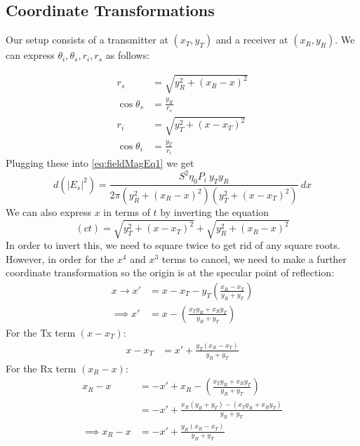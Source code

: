 \documentclass{article}
\begin{document}
\subsection*{Coordinate Transformations}
Our setup consists of a transmitter at $(x_T, y_T)$ and a receiver at 
$(x_R, y_R)$. We can express $\theta_i, \theta_s, r_i, r_s$ as follows:

\begin{align*}
   r_s &= \sqrt{y_R^2 + (x_R - x)^2} \\
   \cos \theta_s &= \frac{y_R}{r_s} \\
   r_i &= \sqrt{y_T^2 + (x - x_T)^2} \\
   \cos \theta_i &= \frac{y_T}{r_i}
\end{align*}
Plugging these into \eqref{eq:fieldMagEq1} we get
\begin{equation}
   d(|E_s|^2) = \frac{S^2 \eta_0 P_i \ y_T y_R }{2 \pi (y_R^2 + (x_R - x)^2) ( y_T^2
      + (x - x_T)^2)} \ dx
   \label{eq:localScaPow2dSetupParam}
\end{equation}
We can also express $x$ in terms of $t$ by inverting the equation
\begin{equation}
   (ct) = \sqrt{y_T^2 + (x - x_T)^2} + \sqrt{y_R^2 + (x_R - x)^2}
   \label{eq:pathLength}
\end{equation} 
In order to invert this, we need to square twice to get rid of any square roots.
However, in order for the $x^4$ and $x^3$ terms to cancel, we need to make a further
coordinate transformation so the origin is at the specular point of reflection: 
\begin{align}
   x \to x' &= x -x_T - y_T \left( \frac{x_R - x_T}{y_R + y_T} \right) \nonumber \\ 
   \implies x' &= x - \left( \frac{x_T y_R + x_R y_T}{y_R + y_T} \right)
   \label{eq:coordTrans}
\end{align}
For the Tx term $(x - x_T)$:
\begin{align}
   x - x_T &= x' + \frac{y_T(x_R - x_T)}{y_R + y_T}
\end{align}
For the Rx term $(x_R - x)$:
\begin{align}
   x_R - x &= -x' + x_R - \left(\frac{x_T y_R + x_R y_T}{y_R + y_T}\right) \nonumber
      \\
   &= -x' + \frac{x_R(y_R+y_T) - (x_T y_R + x_R y_T)}{y_R+y_T} \nonumber \\
   \implies x_R - x &= -x' + \frac{y_R(x_R - x_T)}{y_R + y_T}
\end{align}
\end{document}
